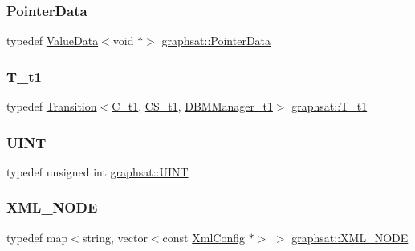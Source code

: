 \mbox{\label{namespacegraphsat_a107ef8404e59d9b9e5c375face044c42}} 
\subsubsection{\texorpdfstring{PointerData}{PointerData}}
{\footnotesize\ttfamily typedef \mbox{\hyperlink{classgraphsat_1_1_value_data}{Value\+Data}}$<$void $\ast$$>$ \mbox{\hyperlink{namespacegraphsat_a107ef8404e59d9b9e5c375face044c42}{graphsat\+::\+Pointer\+Data}}}

\mbox{\label{namespacegraphsat_af60e45e80e42bfeebed3cb349a68905f}} 
\subsubsection{\texorpdfstring{T\_t1}{T\_t1}}
{\footnotesize\ttfamily typedef \mbox{\hyperlink{classgraphsat_1_1_transition}{Transition}}$<$\mbox{\hyperlink{namespacegraphsat_af82e57b58a5af8441762469b70c475da}{C\+\_\+t1}}, \mbox{\hyperlink{namespacegraphsat_a6a55464bf94f0ab98539fd8c3b66c603}{C\+S\+\_\+t1}}, \mbox{\hyperlink{namespacegraphsat_abe6691ac6002381e0250076f52d17b09}{D\+B\+M\+Manager\+\_\+t1}}$>$ \mbox{\hyperlink{namespacegraphsat_af60e45e80e42bfeebed3cb349a68905f}{graphsat\+::\+T\+\_\+t1}}}

\mbox{\label{namespacegraphsat_aa3b3d61a8c27ffc03448c5e1f3a76aed}} 
\subsubsection{\texorpdfstring{UINT}{UINT}}
{\footnotesize\ttfamily typedef unsigned int \mbox{\hyperlink{namespacegraphsat_aa3b3d61a8c27ffc03448c5e1f3a76aed}{graphsat\+::\+U\+I\+NT}}}

\mbox{\label{namespacegraphsat_a8b991d53e7169027cb0197e267a5915b}} 
\subsubsection{\texorpdfstring{XML\_NODE}{XML\_NODE}}
{\footnotesize\ttfamily typedef map$<$string, vector$<$const \mbox{\hyperlink{classgraphsat_1_1_xml_config}{Xml\+Config}} $\ast$$>$ $>$ \mbox{\hyperlink{namespacegraphsat_a8b991d53e7169027cb0197e267a5915b}{graphsat\+::\+X\+M\+L\+\_\+\+N\+O\+DE}}}

